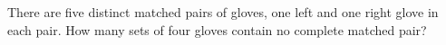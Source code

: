 There are five distinct matched pairs of gloves, one left and one right glove in each pair. How many sets of four gloves contain no complete matched pair?

